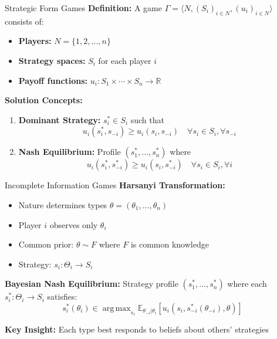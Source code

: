 \documentclass[xcolor={x11names}, aspectratio=169 ]{beamer}
\DeclareMathOperator*{\argmax}{arg\,max}
\begin{document}
\begin{frame}{Strategic Form Games}
\textbf{Definition:} A game $\Gamma = \langle N, (S_i)_{i \in N}, (u_i)_{i \in N} \rangle$ consists of:
\begin{itemize}
  \item \textbf{Players:} $N = \{1, 2, \ldots, n\}$
  \item \textbf{Strategy spaces:} $S_i$ for each player $i$
  \item \textbf{Payoff functions:} $u_i: S_1 \times \cdots \times S_n \to \mathbb{R}$
\end{itemize}

\textbf{Solution Concepts:}
\begin{enumerate}
  \item \textbf{Dominant Strategy:} $s_i^* \in S_i$ such that
  \[u_i(s_i^*, s_{-i}) \geq u_i(s_i, s_{-i}) \quad \forall s_i \in S_i, \forall s_{-i}\]
  
  \item \textbf{Nash Equilibrium:} Profile $(s_1^*, \ldots, s_n^*)$ where
  \[u_i(s_i^*, s_{-i}^*) \geq u_i(s_i, s_{-i}^*) \quad \forall s_i \in S_i, \forall i\]
\end{enumerate}
\end{frame}

\begin{frame}{Incomplete Information Games}
\textbf{Harsanyi Transformation:}
\begin{itemize}
  \item Nature determines types $\theta = (\theta_1, \ldots, \theta_n)$
  \item Player $i$ observes only $\theta_i$
  \item Common prior: $\theta \sim F$ where $F$ is common knowledge
  \item Strategy: $s_i: \Theta_i \to S_i$
\end{itemize}


\textbf{Bayesian Nash Equilibrium:}
Strategy profile $(s_1^*, \ldots, s_n^*)$ where each $s_i^*: \Theta_i \to S_i$ satisfies:
\[s_i^*(\theta_i) \in \argmax_{s_i} \mathbb{E}_{\theta_{-i}|\theta_i}[u_i(s_i, s_{-i}^*(\theta_{-i}), \theta)]\]

\textbf{Key Insight:} Each type best responds to beliefs about others' strategies
\end{frame}
\end{document}
